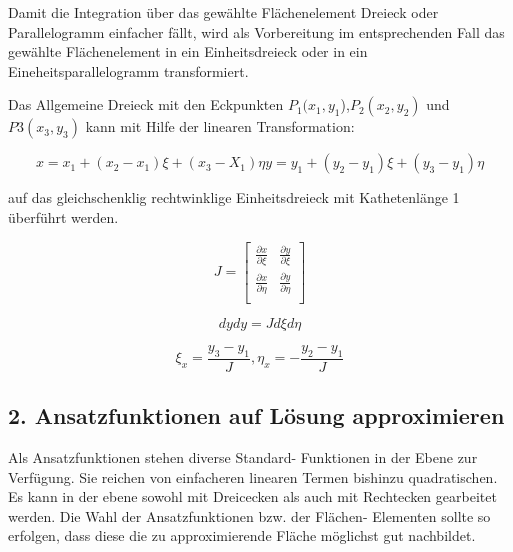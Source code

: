 Damit die Integration über das gewählte Flächenelement Dreieck oder Parallelogramm einfacher fällt, wird als Vorbereitung im entsprechenden Fall das gewählte Flächenelement in ein Einheitsdreieck oder in ein Eineheitsparallelogramm transformiert. 

Das Allgemeine Dreieck mit den Eckpunkten $P_1(x_1, y_1$),$ P_2(x_2, y_2)$ und $P3(x_3,y_3)$ kann mit Hilfe der linearen Transformation:

\begin{equation}
			x = x_1 + (x_2 - x_1)\xi + (x_3 - X_1)\eta
			y = y_1 + (y_2 - y_1)\xi + (y_3 - y_1)\eta
			\label{fem:linTransformation}
\end{equation}

auf das gleichschenklig rechtwinklige Einheitsdreieck mit Kathetenlänge 1 überführt werden.

\begin{equation}
			J = \left[ \begin{array}{rr}
\frac{\partial x}{\partial \xi} & \frac{\partial y}{\partial \xi}  \\
\frac{\partial x}{\partial \eta} & \frac{\partial y}{\partial \eta}  \\
\end{array}\right] 
			\label{fem:JocobiDeterminante}
\end{equation}

\begin{equation}
			dy dy = J d\xi d\eta
			\label{fem:newTransformation}
\end{equation}

\begin{equation}
			\xi_x = \frac{y_3 - y_1}{J}, \eta_x = -\frac{y_2 - y_1}{J}
			\label{fem:newKoordinate}
\end{equation}



\subsection{ 2. Ansatzfunktionen auf Lösung approximieren}

Als Ansatzfunktionen stehen diverse Standard- Funktionen in der Ebene zur Verfügung. Sie reichen von einfacheren linearen Termen bishinzu quadratischen. Es kann in der ebene sowohl mit Dreicecken als auch mit Rechtecken gearbeitet werden. Die Wahl der Ansatzfunktionen bzw. der Flächen- Elementen sollte so erfolgen, dass diese die zu approximierende Fläche möglichst gut nachbildet.

